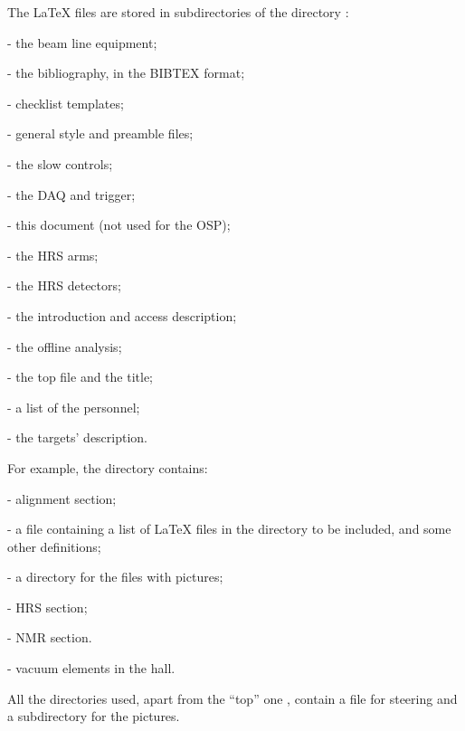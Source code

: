 \documentclass[12pt,letterpaper]{article}
\begin{document}
  The \LaTeX{} files are stored in subdirectories of the directory
  :
  \begin{list}{}{\setlength{\itemsep}{-0.15cm}}
    \item {} - the beam line equipment;
    \item {} - the bibliography, in the BIBTEX format;
    \item {} - checklist templates;
    \item {} - general style and preamble files;
    \item {} - the slow controls;
    \item {} - the DAQ and trigger;
    \item {} - this document (not used for the OSP);
    \item {} - the HRS arms;
    \item {} - the HRS detectors;
    \item {} - the introduction and access description;
    \item {} - the offline analysis;
    \item {} - the top file and the title;
    \item {} - a list of the personnel;
    \item {} - the targets' description.
  \end{list}

 For example, the directory  contains:
  \begin{list}{}{\setlength{\itemsep}{-0.15cm}}
    \item {} - alignment section;
    \item {} - a file containing a list of \LaTeX{} files in
           the directory to be included, and some other definitions;
    \item {} - a directory for the files with pictures;
    \item {} - HRS section;
    \item {} - NMR section.
    \item {}   - vacuum elements in the hall.
  \end{list}
 
 All the directories used, apart from the ``top'' one ,
 contain a file  for steering and a subdirectory
  for the pictures.
\end{document}
